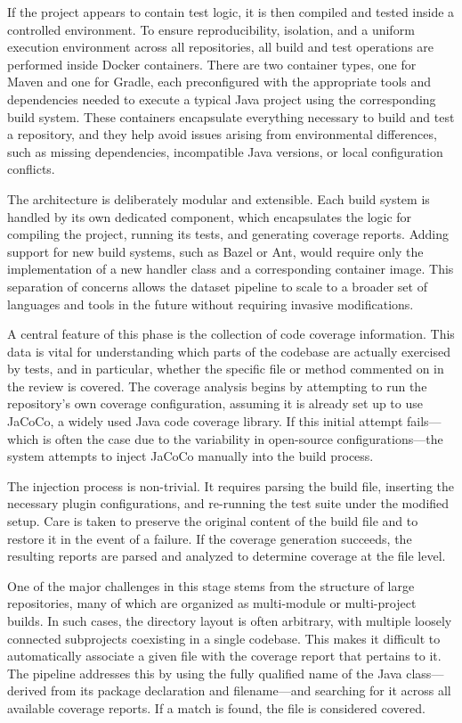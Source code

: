 If the project appears to contain test logic, it is then compiled and tested inside a controlled
environment. To ensure reproducibility, isolation, and a uniform execution environment across all
repositories, all build and test operations are performed inside Docker containers. There are two
container types, one for Maven and one for Gradle, each preconfigured with the appropriate tools and
dependencies needed to execute a typical Java project using the corresponding build system. These
containers encapsulate everything necessary to build and test a repository, and they help avoid
issues arising from environmental differences, such as missing dependencies, incompatible Java
versions, or local configuration conflicts. 

The architecture is deliberately modular and extensible. Each build system is handled by its own
dedicated component, which encapsulates the logic for compiling the project, running its tests, and
generating coverage reports. Adding support for new build systems, such as Bazel or Ant, would
require only the implementation of a new handler class and a corresponding container image. This
separation of concerns allows the dataset pipeline to scale to a broader set of languages and tools
in the future without requiring invasive modifications.

A central feature of this phase is the collection of code coverage information. This data is vital
for understanding which parts of the codebase are actually exercised by tests, and in particular,
whether the specific file or method commented on in the review is covered. The coverage analysis
begins by attempting to run the repository’s own coverage configuration, assuming it is already set
up to use JaCoCo, a widely used Java code coverage library. If this initial attempt fails—which is
often the case due to the variability in open-source configurations—the system attempts to inject
JaCoCo manually into the build process.

The injection process is non-trivial. It requires parsing the build file, inserting the necessary
plugin configurations, and re-running the test suite under the modified setup. Care is taken to
preserve the original content of the build file and to restore it in the event of a failure. If the
coverage generation succeeds, the resulting reports are parsed and analyzed to determine coverage at
the file level.

One of the major challenges in this stage stems from the structure of large repositories, many of
which are organized as multi-module or multi-project builds. In such cases, the directory layout is
often arbitrary, with multiple loosely connected subprojects coexisting in a single codebase. This
makes it difficult to automatically associate a given file with the coverage report that pertains to
it. The pipeline addresses this by using the fully qualified name of the Java class—derived from its
package declaration and filename—and searching for it across all available coverage reports. If a
match is found, the file is considered covered.

